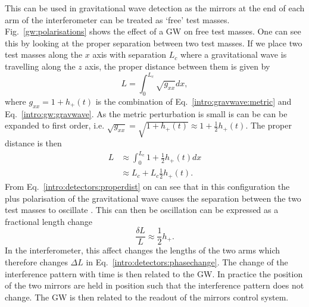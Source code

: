 %
This can be used in gravitational wave detection as the mirrors at the end of each arm of the interferometer can be treated as `free' test masses.
Fig.~\ref{gw:polarisations} shows the effect of a \gls{GW} on free test masses.
One can see this by looking at the proper separation between two test masses. 
If we place two test masses along the $x$ axis with separation $L_c$ where a gravitational wave is travelling along the $z$ axis, the proper distance between them is given by
\begin{equation}
    L = \int_{0}^{L_c} \sqrt{g_{xx}} dx,
\end{equation}
where $g_{xx} = 1 + h_{+}(t)$ is the combination of Eq.~\ref{intro:gravwave:metric} and Eq.~\ref{intro:gw:gravwave}. 
As the metric perturbation is small is can be can be expanded to first order, i.e. $\sqrt{g_{xx}} = \sqrt{1 + h_{+}(t)} \approx 1 + \frac{1}{2}h_{+}(t)$.
The proper distance is then
\begin{equation}
    \label{intro:detectors:properdist}
    \begin{split}
     L &\approx \int_{0}^{L_c} 1 + \frac{1}{2}h_{+}(t) dx \\
      &\approx L_c + L_c \frac{1}{2}h_{+}(t).
    \end{split}
\end{equation}
From Eq.~\ref{intro:detectors:properdist} on can see that in this configuration the plus polarisation of the gravitational wave causes the separation between the two test masses to oscillate \citep{flanagan2005BasicsGravitational}.
This can then be oscillation can be expressed as a fractional length change 
\begin{equation}
    \label{intro:detectors:fraclength}
    \frac{\delta L}{L} \approx \frac{1}{2} h_{+}.
\end{equation}
In the interferometer, this affect changes the lengths of the two arms which therefore changes $\Delta L$ in Eq.~\ref{intro:detectors:phasechange}.
The change of the interference pattern with time is then related to the \gls{GW}.
In practice the position of the two mirrors are held in position such that the interference pattern does not change.
The \gls{GW} is then related to the readout of the mirrors control system.

